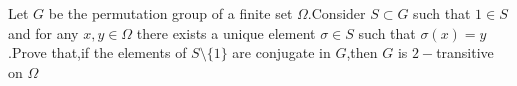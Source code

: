 Let $G$ be the permutation group of a finite set $\Omega$.Consider $S\subset G$ such that $1\in S$ and for any $x,y\in \Omega$ there exists a unique element $\sigma \in S$ such that $\sigma (x)=y$.Prove that,if the elements of $S \setminus \{1\}$ are conjugate in $G$,then $G$ is $2-$transitive on $\Omega$